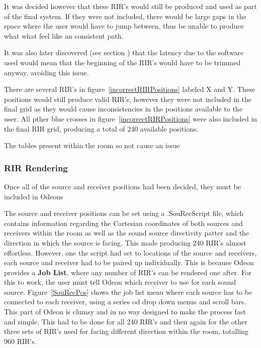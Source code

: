 \documentclass[../../main.tex]{subfiles}
\begin{document}
			It was decided however that these \ac{RIR}'s would still be produced and used as part of the final system. If they were not included, there would be large gaps in the space where the user would have to jump between, thus be unable to produce what what feel like an consistent path.

			It was also later discovered (see section ) that the latency due to the software used would mean that the beginning of the \ac{RIR}'s would have to be trimmed anyway, avoiding this issue.

			There are several \ac{RIR}'s in figure~\ref{incorrectRIRPositions} labeled X and Y. These positions would still produce valid \ac{RIR}'s, however they were not included in the final grid as they would cause inconsistencies in the positions available to the user. All pther blue crosses in figure~\ref{incorrectRIRPositions} were also included in the final \ac{RIR} grid, producing a total of 240 available positions.

			The tables present within the room so not cause an issue 

		\subsubsection{RIR Rendering}

			Once all of the source and receiver positions had been decided, they must be included in Odeons 

			The source and receiver positions can be set using a .SouRecScript file, which contains information regarding the Cartesian coordinates of both sources and receivers within the room as well as the sound source directivity patter and the direction in which the source is facing. This made producing 240 \ac{RIR}'s almost effortless. However, one the script had set to locations of the source and receivers, each source and receiver had to be paired up individually. This is because Odeon provides a \textbf{Job List}, where any number of \ac{RIR}'s can be rendered one after. For this to work, the user must tell Odeon which receiver to use for each sound source. Figure~\ref{SouRecPos} shows the job list menu where each source has to be connected to each receiver, using a series od drop down menus and scroll bars. This part of Odeon is clumsy and in no way designed to make the process fast and simple. This had to be done for all 240 \ac{RIR}'s and then again for the other three sets of \ac{RIR}'s used for facing different direction within the room, totalling 960 \ac{RIR}'s.
\end{document}
